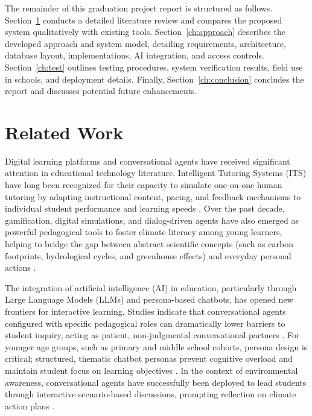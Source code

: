 \documentclass[12pt,a4paper,oneside]{report}
\begin{document}
    The remainder of this graduation project report is structured as follows. Section~\ref{ch:literature} conducts a detailed literature review and compares the proposed system qualitatively with existing tools. Section~\ref{ch:approach} describes the developed approach and system model, detailing requirements, architecture, database layout, implementations, AI integration, and access controls. Section~\ref{ch:test} outlines testing procedures, system verification results, field use in schools, and deployment details. Finally, Section~\ref{ch:conclusion} concludes the report and discusses potential future enhancements.

    \chapter{Related Work}
    \label{ch:literature}

    Digital learning platforms and conversational agents have received significant attention in educational technology literature. Intelligent Tutoring Systems (ITS) have long been recognized for their capacity to simulate one-on-one human tutoring by adapting instructional content, pacing, and feedback mechanisms to individual student performance and learning speeds \cite{vanlehn2011}. Over the past decade, gamification, digital simulations, and dialog-driven agents have also emerged as powerful pedagogical tools to foster climate literacy among young learners, helping to bridge the gap between abstract scientific concepts (such as carbon footprints, hydrological cycles, and greenhouse effects) and everyday personal actions \cite{unesco2019, monroe2019}.

    The integration of artificial intelligence (AI) in education, particularly through Large Language Models (LLMs) and persona-based chatbots, has opened new frontiers for interactive learning. Studies indicate that conversational agents configured with specific pedagogical roles can dramatically lower barriers to student inquiry, acting as patient, non-judgmental conversational partners \cite{wollny2021}. For younger age groups, such as primary and middle school cohorts, persona design is critical; structured, thematic chatbot personas prevent cognitive overload and maintain student focus on learning objectives \cite{wollny2021, kuhail2022}. In the context of environmental awareness, conversational agents have successfully been deployed to lead students through interactive scenario-based discussions, prompting reflection on climate action plans \cite{wollny2021, kuhail2022}.
\end{document}
